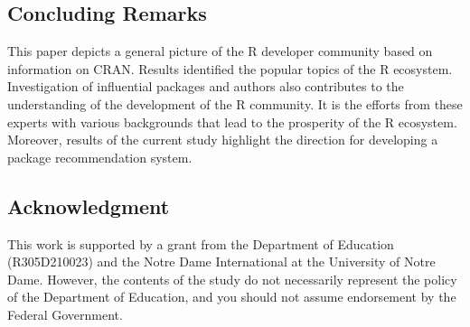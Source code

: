 \subsection{Concluding Remarks}

This paper depicts a general picture of the R developer community based on information on CRAN. Results identified the popular topics of the R ecosystem. Investigation of influential packages and authors also contributes to the understanding of the development of the R community. It is the efforts from these experts with various backgrounds that lead to the prosperity of the R ecosystem. Moreover, results of the current study highlight the direction for developing a package recommendation system.


\subsection{Acknowledgment}

This work is supported by a grant from the Department of Education (R305D210023) and the Notre Dame International at the University of Notre Dame. However, the contents of the study do not necessarily represent the policy of the Department of Education, and you should not assume endorsement by the Federal Government.





\begin{multicols}{2}
\address{Lijin Zhang\\
  Graduate School of Education, Stanford University \\
  United States\\
  ORCiD: 0000-0002-4222-8850\\
  }

\address{Xueyang Li\\
  Department of Computer Science and Engineering, University of Notre Dame\\
  United States\\
  }

 \end{multicols}

\address{Zhiyong Zhang\\
  Department of Psychology, University of Notre Dame\\
  United States\\
  ORCiD: 0000-0003-0590-2196\\
  }
	
